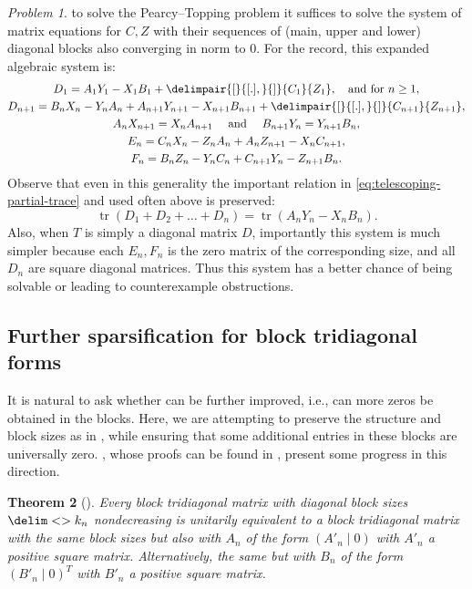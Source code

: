 \documentclass[10pt,reqno]{amsart}
\newtheorem{theorem}{Theorem}[section]
\theoremstyle{remark}
\newtheorem{problem}[theorem]{Problem}
\DeclareMathOperator{\trace}{tr}
\newcommand{\seq}{\delim<>}
\newcommand{\comm}{\delimpair{[}{[.],}{]}}
\numberwithin{equation}{section}
\begin{document}
\begin{problem}
  to solve the Pearcy--Topping problem it suffices to solve the system of matrix equations for $C,Z$ with their sequences of (main, upper and lower) diagonal blocks also converging in norm to 0.
  For the record, this expanded algebraic system is:
  \begin{equation}
    \label{eqProblem4.8}
    \begin{gathered}
      D_1=A_{1}Y_{1}-X_{1}B_{1} + \comm{C_1}{Z_1}, \quad \text{and for } n \ge 1,\\
      D_{n+1}=B_nX_n-Y_nA_n+A_{n+1}Y_{n+1}-X_{n+1}B_{n+1}+ \comm{C_{n+1}}{Z_{n+1}},\\
      A_nX_{n+1}=X_nA_{n+1}\quad\mbox{ and }\quad B_{n+1}Y_n=Y_{n+1}B_n, \\
      E_n=C_{n}X_{n}-Z_{n}A_{n} + A_nZ_{n+1}-X_nC_{n+1},\\
      F_n=B_nZ_n-Y_nC_n+C_{n+1}Y_n-Z_{n+1}B_n.
    \end{gathered}
  \end{equation}
  Observe that even in this generality the important relation in \eqref{eq:telescoping-partial-trace} and used often above is preserved:
  \begin{equation*}
    \trace(D_1+D_2+\dots+D_n)=\trace(A_nY_n - X_nB_n).
  \end{equation*}
  Also, when $T$ is simply a diagonal matrix $D$, importantly this system is much simpler because each $E_n, F_n$ is the zero matrix of the corresponding size, and all $D_n$ are square diagonal matrices.
  Thus this system has a better chance of being solvable or leading to counterexample obstructions.
\end{problem}


\subsection*{Further sparsification for block tridiagonal forms}


It is natural to ask whether  can be further improved, i.e., can more zeros be obtained in the blocks.
Here, we are attempting to preserve the structure and block sizes as in  , while ensuring that some  additional entries in these blocks are universally zero.
, whose proofs can be found in \cite{PPW-2020-TmloVLOt}, present some progress in this direction.




\begin{theorem}[]
  \label{T2}
  Every block tridiagonal matrix with diagonal block sizes $\seq{k_n}$ nondecreasing is unitarily equivalent to a block tridiagonal matrix with the same block sizes but also with $A_n$ of the form $(A'_n \mid 0)$ with $A'_n$ a positive square matrix.
  Alternatively, the same but with $B_n$ of the form $(B'_n \mid 0)^T$ with $B'_n$ a positive square matrix.
\end{theorem}
\end{document}

